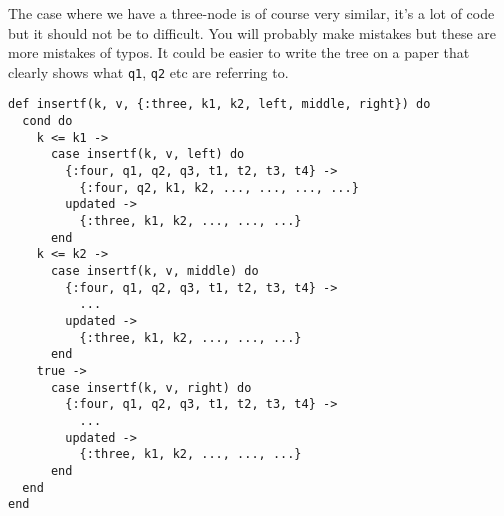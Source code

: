 \documentclass[a4paper,11pt]{article}
\begin{document}
The case where we have a three-node is of course very similar, it's a
lot of code but it should not be to difficult. You will probably make
mistakes but these are more mistakes of typos. It could be easier to
write the tree on a paper that clearly shows what {\tt q1}, {\tt q2}
etc are referring to.

\begin{verbatim}
def insertf(k, v, {:three, k1, k2, left, middle, right}) do
  cond do
    k <= k1 ->
      case insertf(k, v, left) do
        {:four, q1, q2, q3, t1, t2, t3, t4} -> 
          {:four, q2, k1, k2, ..., ..., ..., ...} 
        updated ->
          {:three, k1, k2, ..., ..., ...}
      end
    k <= k2 ->
      case insertf(k, v, middle) do
        {:four, q1, q2, q3, t1, t2, t3, t4} -> 		
          ...
        updated ->
          {:three, k1, k2, ..., ..., ...}
      end
    true ->
      case insertf(k, v, right) do
        {:four, q1, q2, q3, t1, t2, t3, t4} -> 		
          ...
        updated ->
          {:three, k1, k2, ..., ..., ...}
      end
  end
end
\end{verbatim}
\end{document}
